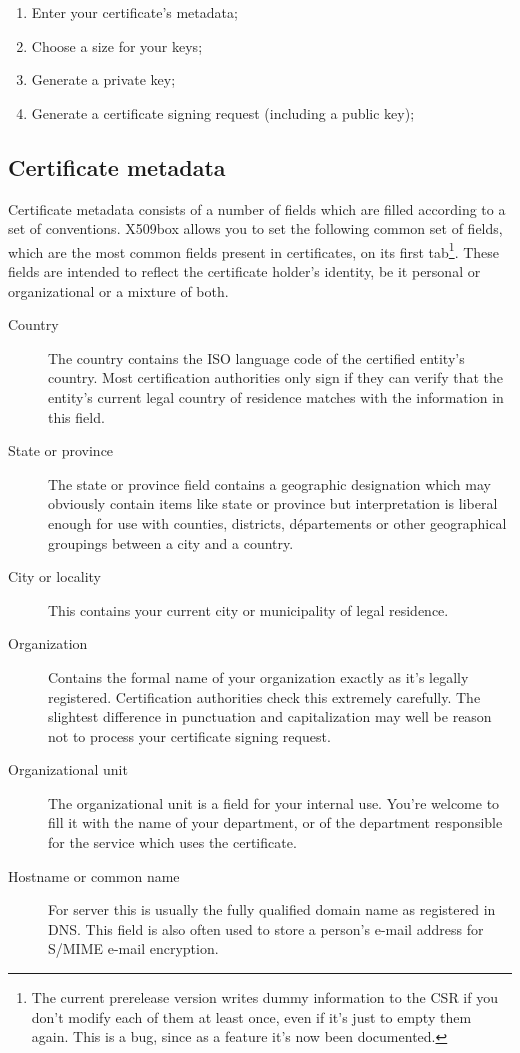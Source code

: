 \documentclass[a4paper,12pt]{article}
\begin{document}
\begin{enumerate}
\item Enter your certificate's metadata;
\item Choose a size for your keys;
\item Generate a private key;
\item Generate a certificate signing request (including a public key);
\end{enumerate}

\subsection{Certificate metadata}
Certificate metadata consists of a number of fields which are filled according to a set of conventions. X509box allows you to set the following common set of fields, which are the most common fields present in certificates, on its first tab\footnote{The current prerelease version writes dummy information to the CSR if you don't modify each of them at least once, even if it's just to empty them again. This is a bug, since as a feature it's now been documented.}. These fields are intended to reflect the certificate holder's identity, be it personal or organizational or a mixture of both.

\begin{description}
\item[Country]The country contains the ISO language code of the certified entity's country. Most certification authorities only sign if they can verify that the entity's current legal country of residence matches with the information in this field.
\item[State or province]The state or province field contains a geographic designation which may obviously contain items like state or province but interpretation is liberal enough for use with counties, districts, départements or other geographical groupings between a city and a country.
\item[City or locality]This contains your current city or municipality of legal residence.
\item[Organization]Contains the formal name of your organization exactly as it's legally registered. Certification authorities check this extremely carefully. The slightest difference in punctuation and capitalization may well be reason not to process your certificate signing request.
\item[Organizational unit]The organizational unit is a field for your internal use. You're welcome to fill it with the name of your department, or of the department responsible for the service which uses the certificate.
\item[Hostname or common name]For server this is usually the fully qualified domain name as registered in DNS. This field is also often used to store a person's e-mail address for S/MIME e-mail encryption.
\end{description}
\end{document}
